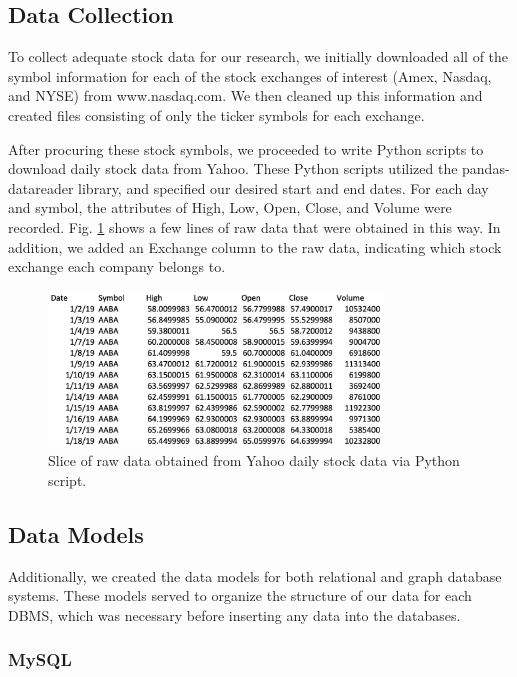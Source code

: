 \documentclass{IEEEtran}
\begin{document}
\subsection{Data Collection}

To collect adequate stock data for our research, we initially downloaded all of the symbol information for each of the stock exchanges of interest (Amex, Nasdaq, and NYSE) from www.nasdaq.com. We then cleaned up this information and created files consisting of only the ticker symbols for each exchange. 

After procuring these stock symbols, we proceeded to write Python scripts to download daily stock data from Yahoo. These Python scripts utilized the pandas-datareader library, and specified our desired start and end dates. For each day and symbol, the attributes of High, Low, Open, Close, and Volume were recorded. Fig. \ref{fig:raw_data} shows a few lines of raw data that were obtained in this way. In addition, we added an Exchange column to the raw data, indicating which stock exchange each company belongs to.  

\begin{figure}
	\centering
	\includegraphics[width=3.5in]{Images/raw_stock_data.png}
	\caption{Slice of raw data obtained from Yahoo daily stock data via Python script.}
	\label{fig:raw_data}
\end{figure}

\subsection{Data Models}

Additionally, we created the data models for both relational and graph database systems. These models served to organize the structure of our data for each DBMS, which was necessary before inserting any data into the databases. 

\subsubsection{MySQL} 
\end{document}
